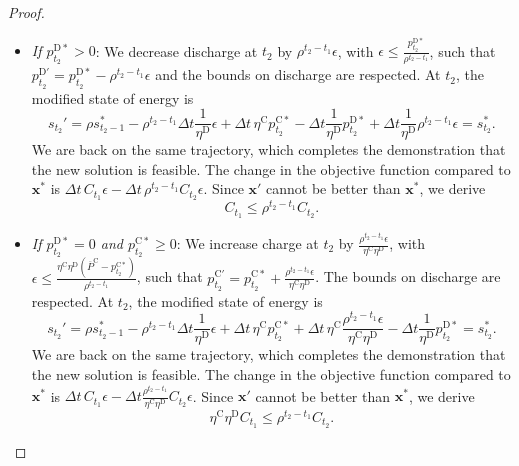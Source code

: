 \documentclass[10pt,a4paper]{amsart}
\newcommand{\up}[1]{^{\mathrm{#1}}}
\begin{document}
\begin{proof}
    \begin{itemize}
        \item \textit{If $p\up{D*}_{t_2}>0$}: We decrease discharge at $t_2$ by $\rho^{t_2 - t_1} \epsilon$, with ${\epsilon} \leq \frac{p\up{D*}_{t_2}}{\rho^{t_2 - t_1}}$, such that ${p}\up{D'}_{t_2}={p}\up{D*}_{t_2}-\rho^{t_2 - t_1}\epsilon$ and the bounds on discharge are respected.
        At $t_2$, the modified state of energy is
        \begin{equation}
            {s}_{t_2}' = \rho {s}_{t_2-1}^* - \rho^{t_2 - t_1} \Delta t \frac{1}{\eta\up{D}} {\epsilon} +\Delta t \, \eta\up{C} {p}\up{C*}_{t_2} - \Delta t \frac{1}{\eta\up{D}} {p}\up{D*}_{t_2} + \Delta t \frac{1}{\eta\up{D}} \rho^{t_2 - t_1} \epsilon = {s}_{t_2}^*.  
        \end{equation}
        We are back on the same trajectory, which completes the demonstration that the new solution is feasible.
        The change in the objective function compared to $\mathbf{x}^*$ is $ \Delta t \, C_{t_1} \epsilon - \Delta t \, \rho^{t_2 - t_1} C_{t_2} \epsilon$. Since $\mathbf{x}'$ cannot be better than $\mathbf{x}^*$, we derive
        \begin{equation} \label{eq:star_pd_pd}
            C_{t_1} \leq \rho^{t_2 - t_1} C_{t_2}.
        \end{equation}
        \item \textit{If $p\up{D*}_{t_2}=0$ and $p\up{C*}_{t_2}\geq 0$}: We increase charge at $t_2$ by $\frac{ \rho^{t_2 - t_1} \epsilon}{\eta\up{C} \eta\up{D}}$, with ${\epsilon} \leq \frac{\eta\up{C} \eta\up{D} (\overline{P}\up{C} - p\up{C*}_{t_2})}{\rho^{t_2 - t_1}}$, such that ${p}\up{C'}_{t_2}={p}\up{C*}_{t_2}+\frac{\rho^{t_2 - t_1} \epsilon}{\eta\up{C} \eta\up{D}}$. The bounds on discharge are respected.
        At $t_2$, the modified state of energy is
        \begin{equation}
            {s}_{t_2}' = \rho {s}_{t_2-1}^* - \rho^{t_2 - t_1} \Delta t \frac{1}{\eta\up{D}} {\epsilon} +\Delta t \, \eta\up{C} {p}\up{C*}_{t_2} +\Delta t \, \eta\up{C} \frac{\rho^{t_2 - t_1} \epsilon}{\eta\up{C} \eta\up{D}} - \Delta t \frac{1}{\eta\up{D}} {p}\up{D*}_{t_2} ={s}_{t_2}^*.
        \end{equation}
        We are back on the same trajectory, which completes the demonstration that the new solution is feasible.
        The change in the objective function compared to $\mathbf{x}^*$ is $ \Delta t \, C_{t_1} \epsilon - \Delta t \frac{\rho^{t_2 - t_1}}{\eta\up{C} \eta\up{D}} C_{t_2} \epsilon $. Since $\mathbf{x}'$ cannot be better than $\mathbf{x}^*$, we derive
        \begin{equation} \label{eq:star_pd_pc}
            \eta\up{C} \eta\up{D} C_{t_1} \leq \rho^{t_2 - t_1} C_{t_2}.
        \end{equation}
    \end{itemize}


\end{proof}
\end{document}
